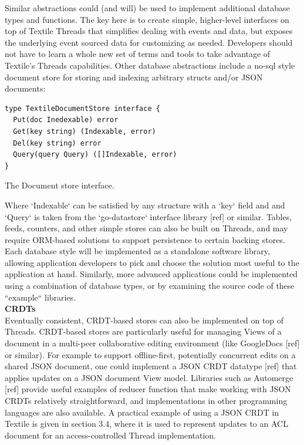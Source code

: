 \documentclass{comjnl}
\begin{document}
Similar abstractions could (and will) be used to implement additional database types and functions. The key here is to create simple, higher-level interfaces on top of Textile Threads that simplifies dealing with events and data, but exposes the underlying event sourced data for customizing as needed. Developers should not have to learn a whole new set of terms and tools to take advantage of Textile’s Threads capabilities. Other database abstractions include a no-sql style document store for storing and indexing arbitrary structs and/or JSON documents:

\begin{example}
\begin{minipage}{.45\textwidth}
\begin{lstlisting}
type TextileDocumentStore interface {
  Put(doc Inedexable) error
  Get(key string) (Indexable, error)
  Del(key string) error
  Query(query Query) ([]Indexable, error)
}
\end{lstlisting}
\end{minipage}
\caption{The Document store interface.}
\end{example} \label{ex:AddrBook}

Where `Indexable` can be satisfied by any structure with a  `key` field and and `Query` is taken from the `go-datastore` interface library [ref] or similar. Tables, feeds, counters, and other simple stores can also be built on Threads, and may require ORM-based solutions to support persistence to certain backing stores. Each database style will be implemented as a standalone software library, allowing application developers to pick and choose the solution most useful to the application at hand. Similarly, more advanced applications could be implemented using a combination of database types, or by examining the source code of these “example“ libraries.\\

\textbf{CRDTs} \\

Eventually consistent, CRDT-based stores can also be implemented on top of Threads. CRDT-based stores are particularly useful for managing Views of a document in a multi-peer collaborative editing environment (like GoogleDocs [ref] or similar). For example to support offline-first, potentially concurrent edits on a shared JSON document, one could implement a JSON CRDT datatype [ref] that applies updates on a JSON document View model. Libraries such as Automerge [ref] provide useful examples of reducer function that make working with JSON CRDTs relatively straightforward, and implementations in other programming languages are also available. A practical example of using a JSON CRDT in Textile is given in section 3.4, where it is used to represent updates to an ACL document for an access-controlled Thread implementation.\\
\end{document}
